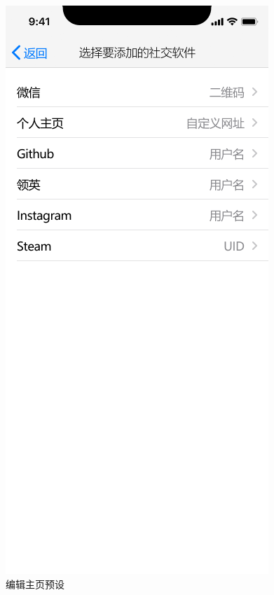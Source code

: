 \documentclass[UTF8]{ctexart}
\begin{document}
\begin{figure}[htbp]
{\begin{minipage}[b]{.3\linewidth}
            \includegraphics[scale=0.3]{ChooseSocialAPP.png}
        \end{minipage}
    }
    \caption{编辑主页预设}
    \label{EditHomepage}
\end{figure}
\end{document}
